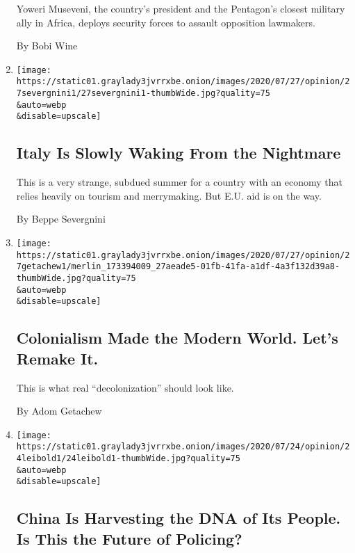 \begin{enumerate}
  Yoweri Museveni, the country's president and the Pentagon's closest
  military ally in Africa, deploys security forces to assault opposition
  lawmakers.

  By Bobi Wine
\item
  \href{/2020/07/27/opinion/italy-coronavirus.html}{}

  \texttt{[image: https://static01.graylady3jvrrxbe.onion/images/2020/07/27/opinion/27severgnini1/27severgnini1-thumbWide.jpg?quality=75\\\&auto=webp\\\&disable=upscale]}

  \hypertarget{italy-is-slowly-waking-from-the-nightmare}{%
  \subsection{Italy Is Slowly Waking From the
  Nightmare}\label{italy-is-slowly-waking-from-the-nightmare}}

  This is a very strange, subdued summer for a country with an economy
  that relies heavily on tourism and merrymaking. But E.U. aid is on the
  way.

  By Beppe Severgnini
\item
  \href{/2020/07/27/opinion/sunday/decolonization-statues.html}{}

  \texttt{[image: https://static01.graylady3jvrrxbe.onion/images/2020/07/27/opinion/27getachew1/merlin\_173394009\_27aeade5-01fb-41fa-a1df-4a3f132d39a8-thumbWide.jpg?quality=75\\\&auto=webp\\\&disable=upscale]}

  \hypertarget{colonialism-made-the-modern-world-lets-remake-it}{%
  \subsection{Colonialism Made the Modern World. Let's Remake
  It.}\label{colonialism-made-the-modern-world-lets-remake-it}}

  This is what real ``decolonization'' should look like.

  By Adom Getachew
\item
  \href{/2020/07/24/opinion/china-dna-police.html}{}

  \texttt{[image: https://static01.graylady3jvrrxbe.onion/images/2020/07/24/opinion/24leibold1/24leibold1-thumbWide.jpg?quality=75\\\&auto=webp\\\&disable=upscale]}

  \hypertarget{china-is-harvesting-the-dna-of-its-people-is-this-the-future-of-policing}{%
  \subsection{China Is Harvesting the DNA of Its People. Is This the
  Future of
  Policing?}\label{china-is-harvesting-the-dna-of-its-people-is-this-the-future-of-policing}}


\end{enumerate}
